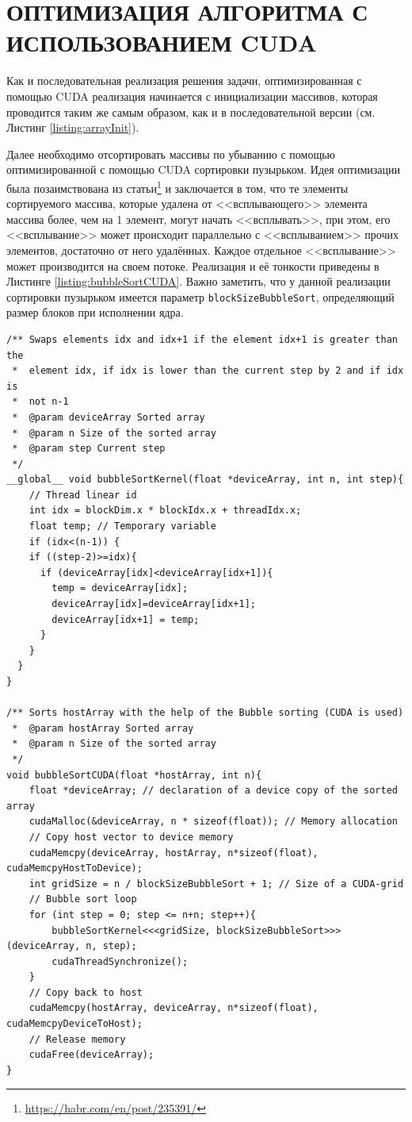\section{ОПТИМИЗАЦИЯ АЛГОРИТМА С ИСПОЛЬЗОВАНИЕМ CUDA}

Как и последовательная реализация решения задачи, оптимизированная с помощью CUDA реализация начинается с инициализации массивов, которая проводится таким же самым образом, как и в последовательной версии (см. Листинг \ref{listing:arrayInit}).

Далее необходимо отсортировать массивы по убыванию с помощью оптимизированной с помощью CUDA сортировки пузырьком. Идея оптимизации была позаимствована из статьи\footnote{\url{https://habr.com/en/post/235391/}} и заключается в том, что те элементы сортируемого массива, которые удалена от <<всплывающего>> элемента массива более, чем на 1 элемент, могут начать <<всплывать>>, при этом, его <<всплывание>> может происходит параллельно с <<всплыванием>> прочих элементов, достаточно от него удалённых. Каждое отдельное <<всплывание>> может производится на своем потоке. Реализация и её тонкости приведены в Листинге \ref{listing:bubbleSortCUDA}. Важно заметить, что у данной реализации сортировки пузырьком имеется параметр \texttt{blockSizeBubbleSort}, определяющий размер блоков при исполнении ядра.
\begin{lstlisting}[style=CStyle, label={listing:bubbleSortCUDA}, caption={Оптимизированная с помощью CUDA версия сортировки пузырьком.}]
/** Swaps elements idx and idx+1 if the element idx+1 is greater than the
 * 	element idx, if idx is lower than the current step by 2 and if idx is
 *  not n-1
 *  @param deviceArray Sorted array
 *	@param n Size of the sorted array
 * 	@param step Current step
 */ 
__global__ void bubbleSortKernel(float *deviceArray, int n, int step){
	// Thread linear id
	int idx = blockDim.x * blockIdx.x + threadIdx.x;
	float temp; // Temporary variable
	if (idx<(n-1)) {
    if ((step-2)>=idx){
      if (deviceArray[idx]<deviceArray[idx+1]){
        temp = deviceArray[idx];
        deviceArray[idx]=deviceArray[idx+1];
        deviceArray[idx+1] = temp;
      }
    }
  }
}

/** Sorts hostArray with the help of the Bubble sorting (CUDA is used)
 *	@param hostArray Sorted array
 *	@param n Size of the sorted array
 */
void bubbleSortCUDA(float *hostArray, int n){
	float *deviceArray; // declaration of a device copy of the sorted array
	cudaMalloc(&deviceArray, n * sizeof(float)); // Memory allocation
	// Copy host vector to device memory
	cudaMemcpy(deviceArray, hostArray, n*sizeof(float), cudaMemcpyHostToDevice);
	int gridSize = n / blockSizeBubbleSort + 1; // Size of a CUDA-grid
	// Bubble sort loop
	for (int step = 0; step <= n+n; step++){
		bubbleSortKernel<<<gridSize, blockSizeBubbleSort>>>(deviceArray, n, step);
		cudaThreadSynchronize();
	}
	// Copy back to host
	cudaMemcpy(hostArray, deviceArray, n*sizeof(float), cudaMemcpyDeviceToHost);
	// Release memory
	cudaFree(deviceArray);
}
\end{lstlisting}

